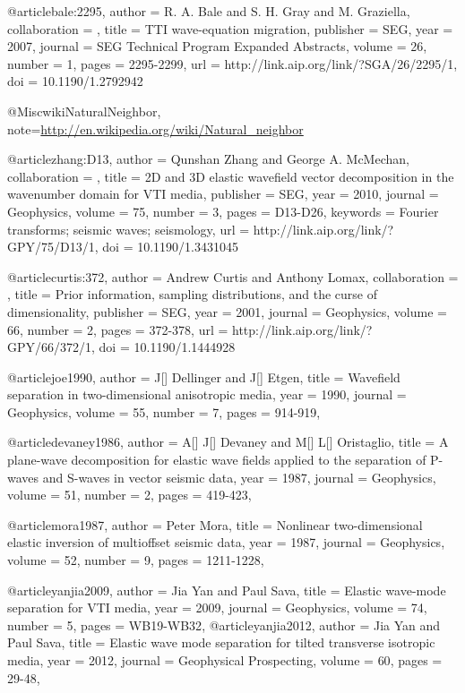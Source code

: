 {@article{bale:2295,
author = {R. A. Bale and S. H. Gray and M. Graziella},
collaboration = {},
title = {TTI wave-equation migration},
publisher = {SEG},
year = {2007},
journal = {SEG Technical Program Expanded Abstracts},
volume = {26},
number = {1},
pages = {2295-2299},
url = {http://link.aip.org/link/?SGA/26/2295/1},
doi = {10.1190/1.2792942}
}


@Misc{wikiNaturalNeighbor,
  note={\url{http://en.wikipedia.org/wiki/Natural_neighbor}  }
}



@article{zhang:D13,
author = {Qunshan Zhang and George A. McMechan},
collaboration = {},
title = {2D and 3D elastic wavefield vector decomposition in the wavenumber domain for VTI media},
publisher = {SEG},
year = {2010},
journal = {Geophysics},
volume = {75},
number = {3},
pages = {D13-D26},
keywords = {Fourier transforms; seismic waves; seismology},
url = {http://link.aip.org/link/?GPY/75/D13/1},
doi = {10.1190/1.3431045}
}



@article{curtis:372,
author = {Andrew Curtis and Anthony Lomax},
collaboration = {},
title = {Prior information, sampling distributions, and the curse of dimensionality},
publisher = {SEG},
year = {2001},
journal = {Geophysics},
volume = {66},
number = {2},
pages = {372-378},
url = {http://link.aip.org/link/?GPY/66/372/1},
doi = {10.1190/1.1444928}
}

@article{joe1990,
author = {J[] Dellinger and J[] Etgen},
title = {Wavefield separation in two-dimensional anisotropic media},
year = {1990},
journal = {Geophysics},
volume = {55},
number = {7},
pages = {914-919},
}

@article{devaney1986,
author = {A[] J[] Devaney and M[] L[] Oristaglio},
title = {A plane-wave decomposition for elastic wave fields applied to the separation of P-waves and S-waves in vector seismic data},
year = {1987},
journal = {Geophysics},
volume = {51},
number = {2},
pages = {419-423},
}

@article{mora1987,
author = {Peter Mora},
title = {Nonlinear two-dimensional elastic inversion of multioffset seismic data},
year = {1987},
journal = {Geophysics},
volume = {52},
number = {9},
pages = {1211-1228},
}

@article{yanjia2009,
author = {Jia Yan and Paul Sava},
title = {Elastic wave-mode separation for VTI media},
year = {2009},
journal = {Geophysics},
volume = {74},
number = {5},
pages = {WB19-WB32},
}
@article{yanjia2012,
author = {Jia Yan and Paul Sava},
title = {Elastic wave mode separation for tilted transverse isotropic media},
year = {2012},
journal = {Geophysical Prospecting},
volume = {60},
pages = {29-48},
}

}
